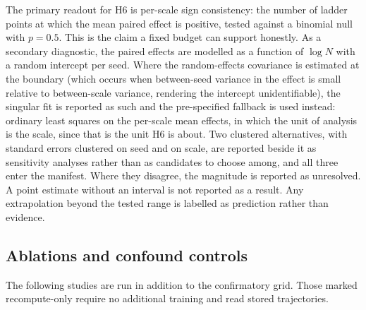 \documentclass[final,5p,times,twocolumn]{elsarticle}
\theoremstyle{remark}
\begin{document}
The primary readout for H6 is per-scale sign consistency: the number of ladder
points at which the mean paired effect is positive, tested against a binomial
null with $p = 0.5$. This is the claim a fixed budget can support honestly. As
a secondary diagnostic, the paired effects are modelled as a function of
$\log N$ with a random intercept per seed. Where the random-effects covariance
is estimated at the boundary (which occurs when between-seed variance in the
effect is small relative to between-scale variance, rendering the intercept
unidentifiable), the singular fit is reported as such and the pre-specified
fallback is used instead: ordinary least squares on the per-scale mean effects,
in which the unit of analysis is the scale, since that is the unit H6 is about.
Two clustered alternatives, with standard errors clustered on seed and on
scale, are reported beside it as sensitivity analyses rather than as
candidates to choose among, and all three enter the manifest. Where they
disagree, the magnitude is reported as unresolved. A point estimate without an
interval is not reported as a result. Any extrapolation beyond the tested range
is labelled as prediction rather than evidence.

\subsection{Ablations and confound controls}
\label{sec:ablations}

The following studies are run in addition to the confirmatory grid. Those marked
recompute-only require no additional training and read stored
trajectories.
\end{document}
